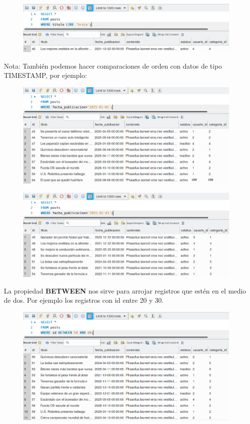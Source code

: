 \documentclass{article}
\begin{document}
\begin{figure}[h!]
  \centering
  \includegraphics[scale=0.75]{./Pictures/110_where_like.png}
\end{figure}

Nota: También podemos hacer comparaciones de orden con datos de tipo TIMESTAMP, por ejemplo:
\begin{figure}[h!]
  \centering
  \includegraphics[scale=0.75]{./Pictures/111_where_fecha.png}
\end{figure}

\begin{figure}[h!]
  \centering
  \includegraphics[scale=0.75]{./Pictures/112_where_fecha.png}
\end{figure}

La propiedad \textbf{BETWEEN} nos sirve para arrojar registros que estén en el
medio de dos. Por ejemplo los registros con id entre 20 y 30.

\begin{figure}[h!]
  \centering
  \includegraphics[scale=0.75]{./Pictures/114_where_id_between.png}
\end{figure}
\end{document}
